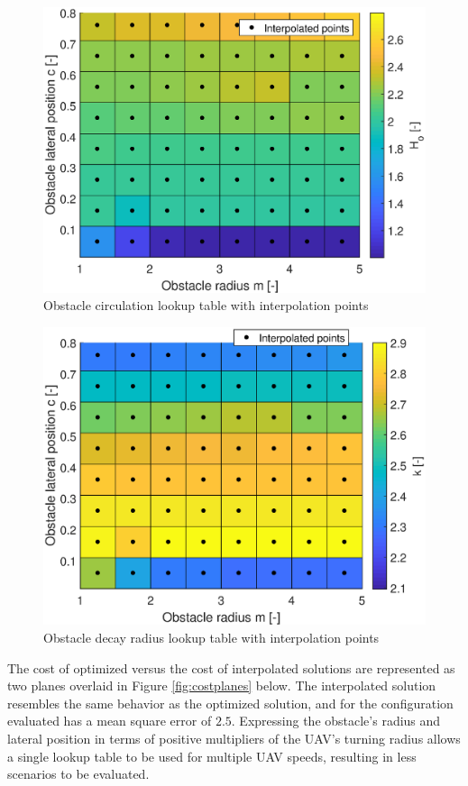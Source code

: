 \documentclass[numbered,pdftex]{ohio-etd}
\begin{document}
\begin{figure}[H]
	\centering
	\includegraphics[width=12cm]{PaperFigures/Methods/LookupTable/hTableInterpolationPoints}
	\caption{Obstacle circulation lookup table with interpolation points}
	\label{fig:htableInterp}
\end{figure}


\begin{figure}[H]
	\centering
	\includegraphics[width=12cm]{PaperFigures/Methods/LookupTable/kTableInterpolationPoints}
	\caption{Obstacle decay radius lookup table with interpolation points}
	\label{fig:ktableInterp}
\end{figure}

The cost of optimized versus the cost of interpolated solutions are represented as two planes overlaid in Figure \ref{fig:costplanes} below. The interpolated solution resembles the same behavior as the optimized solution, and for the configuration evaluated has a mean square error of $2.5$. Expressing the obstacle's radius and lateral position in terms of positive multipliers of the UAV's turning radius allows a single lookup table to be used for multiple UAV speeds, resulting in less scenarios to be evaluated.
\end{document}
